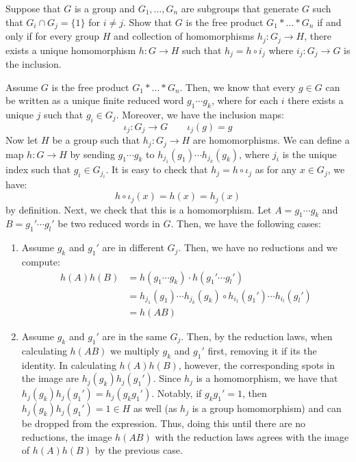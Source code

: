 \documentclass[12pt]{article}
\begin{document}
\begin{problab}{3}
    Suppose that $G$ is a group and $G_1, \hdots, G_n$ are subgroups that generate $G$ such that $G_i \cap G_j = \{ 1 \}$ for $i \neq j$. Show that $G$ is the free product $G_1 * \hdots * G_n$ if and only if for every group $H$ and collection of homomorphisms $h_j : G_j \to H$, there exists a unique homomorphism $h: G \to H$ such that $h_j = h \circ i_j$ where $i_j: G_j \to G$ is the inclusion.
\end{problab}
\begin{solu}
    Assume $G$ is the free product $G_1 * \hdots * G_n$. Then, we know that every $g \in G$ can be written as a unique finite reduced word $g_1 \cdots g_k$, where for each $i$ there exists a unique $j$ such that $g_i \in G_j$. Moreover, we have the inclusion maps: 
    \[ \iota_j : G_j \to G \qquad \iota_j(g) = g\] 
    Now let $H$ be a group such that $h_j : G_j \to H$ are homomorphisms. We can define a map $h: G \to H$ by sending $g_1 \cdots g_k$ to $h_{j_1}(g_1) \cdots h_{j_k}(g_k)$, where $j_i$ is the unique index such that $g_i \in G_{j_i}$. It is easy to check that $h_j = h \circ \iota_j$ as for any $x \in G_j$, 
    we have: 
    \[ h \circ \iota_j(x) = h(x) = h_j(x)\]
    by definition. Next, we check that this is a homomorphism. Let $A = g_1 \cdots g_k$ and $B = g_1' \cdots g_l'$ be two reduced words in $G$. Then, we have the following cases:
    \begin{enumerate}
        \item Assume $g_k$ and $g_1'$ are in different $G_j$. Then, we have no reductions and we compute: 
        \begin{align*}
            h(A)h(B) &= h(g_1 \cdots g_k) \cdot h(g_1' \cdots g_l') \\
            &= h_{j_1}(g_1) \cdots h_{j_k}(g_k) \circ h_{i_1}(g_1') \cdots h_{i_l}(g_l') \\
            &= h(AB)
        \end{align*}
        \item Assume $g_k$ and $g_1'$ are in the same $G_j$. Then, by the reduction laws, when calculating $h(AB)$ we multiply $g_k$ and $g_1'$ first, removing it if its the identity. In calculating $h(A)h(B)$, however, the corresponding spots in the image are $h_j(g_k)h_j(g_1')$. Since $h_j$ is a homomorphism, we have that $h_j(g_k)h_j(g_1') = h_j(g_k g_1')$. Notably, if $g_k g_1' = 1$, then $h_j(g_k)h_j(g_1') = 1 \in H$ as well (as $h_j$ is a group homomorphism) and can be dropped from the expression. Thus, doing this until there are no reductions, the image $h(AB)$ with the reduction laws agrees with the image of $h(A)h(B)$ by the previous case.

\end{enumerate}
\end{solu}
\end{document}
